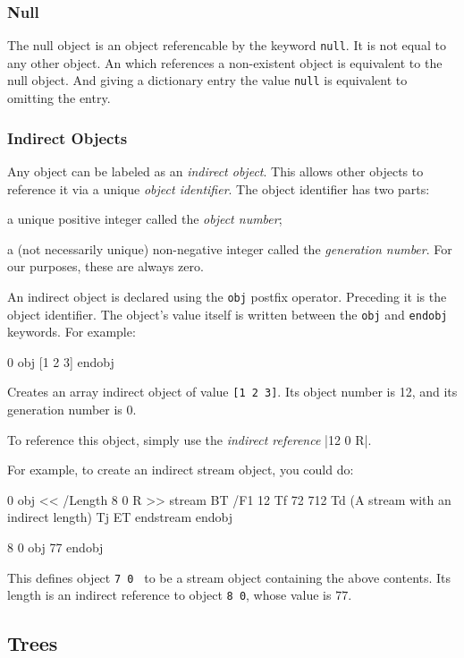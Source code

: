 \subsubsection{Null}

The null object is an object referencable by the keyword {\tt null}.
It is not equal to any other object.
An  which references a non-existent object is equivalent to the
null object.
And giving a dictionary entry the value {\tt null} is equivalent to omitting the entry.

\subsubsection{Indirect Objects} 

Any object can be labeled as an {\it indirect object}.
This allows other objects to reference it via a unique {\it object identifier}.
The object identifier has two parts:
\benum
    \item a unique positive integer called the {\it object number};
    \item a (not necessarily unique) non-negative integer called the {\it generation number}.
        For our purposes, these are always zero.
\eenum

An indirect object is declared using the {\tt obj} postfix operator.
Preceding it is the object identifier.
The object's value itself is written between the {\tt obj} and {\tt endobj} keywords.
For example:

 0 obj
    [1 2 3]
endobj
\elisting

Creates an array indirect object of value {\tt[1 2 3]}.
Its object number is 12, and its generation number is 0.

To reference this object, simply use the {\it indirect reference} \inlinecode|12 0 R|.

For example, to create an indirect stream object, you could do:

 0 obj
    << /Length 8 0 R >>
stream
    BT
        /F1 12 Tf
        72 712 Td
        (A stream with an indirect length) Tj
    ET
endstream
endobj

8 0 obj
    77
endobj
\elisting

This defines object {\tt7 0 } to be a stream object containing the above contents.
Its length is an indirect reference to object {\tt8 0}, whose value is $77$.

\subsection{Trees}

